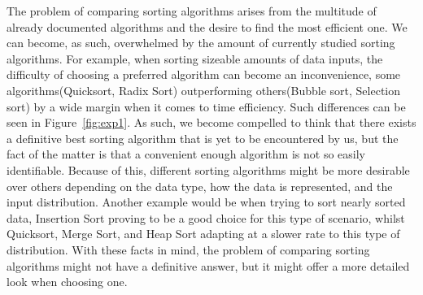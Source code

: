 \documentclass{article}
\numberwithin{figure}{section}
\begin{document}
The problem of comparing sorting algorithms arises from the multitude of already documented algorithms and the desire to find the most efficient one. We can become, as such, overwhelmed by the amount of currently studied sorting algorithms. For example, when sorting sizeable amounts of data inputs, the difficulty of choosing a preferred algorithm can become an inconvenience, some algorithms(Quicksort, Radix Sort) outperforming others(Bubble sort, Selection sort) by a wide margin when it comes to time efficiency. Such differences can be seen in Figure~\ref{fig:exp1}. As such, we become compelled to think that there exists a definitive best sorting algorithm that is yet to be encountered by us, but the fact of the matter is that a convenient enough algorithm is not so easily identifiable. Because of this, different sorting algorithms might be more desirable over others depending on the data type, how the data is represented, and the input distribution. Another example would be when trying to sort nearly sorted data, Insertion Sort proving to be a good choice for this type of scenario, whilst Quicksort, Merge Sort, and Heap Sort adapting at a slower rate to this type of distribution. With these facts in mind, the problem of comparing sorting algorithms might not have a definitive answer, but it might offer a more detailed look when choosing one.
\end{document}
